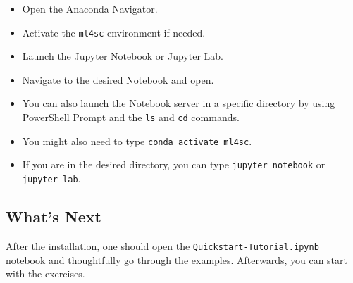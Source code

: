 \documentclass[a4paper]{article}
\begin{document}
\begin{enumerate}[label=\arabic*.]
        \begin{itemize}
            \item Open the Anaconda Navigator.
            \item Activate the \texttt{ml4sc} environment if needed.
            \item Launch the Jupyter Notebook or Jupyter Lab.
            \item Navigate to the desired Notebook and open.
            \item You can also launch the Notebook server in a specific directory by using PowerShell Prompt and the \texttt{ls} and \texttt{cd} commands.
            \item You might also need to type \texttt{conda activate ml4sc}.
            \item If you are in the desired directory, you can type \texttt{jupyter notebook} or \texttt{jupyter-lab}.
        \end{itemize}
\end{enumerate}

\subsection*{What's Next}

After the installation, one should open the \texttt{Quickstart-Tutorial.ipynb} notebook and thoughtfully go through the examples. Afterwards, you can start with the exercises.
\end{document}
